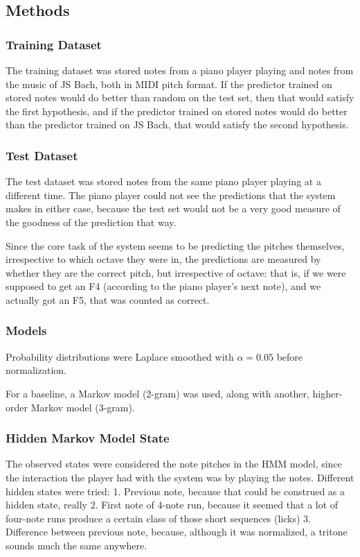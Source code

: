 \documentclass{article}
\begin{document}
\subsection*{Methods}
\subsubsection*{Training Dataset}
The training dataset was stored notes from a piano player playing and notes from the music of JS Bach, both in MIDI pitch format. If the predictor trained on stored notes would do better than random on the test set, then that would satisfy the first hypothesis, and if the predictor trained on stored notes would do better than the predictor trained on JS Bach, that would satisfy the second hypothesis.
\subsubsection*{Test Dataset}
The test dataset was stored notes from the same piano player playing at a different time. The piano player could not see the predictions that the system makes in either case, because the test set would not be a very good measure of the goodness of the prediction that way.

Since the core task of the system seems to be predicting the pitches themselves, irrespective to which octave they were in, the predictions are measured by whether they are the correct pitch, but irrespective of octave: that is, if we were supposed to get an F4 (according to the piano player's next note), and we actually got an F5, that was counted as correct.
\subsubsection*{Models}

Probability distributions were Laplace smoothed with $\alpha = 0.05$ before normalization.

For a baseline, a Markov model (2-gram) was used, along with another, higher-order Markov model (3-gram).

\subsubsection*{Hidden Markov Model State}
The observed states were considered the note pitches in the HMM model, since the interaction the player had with the system was by playing the notes.
Different hidden states were tried:
1. Previous note, because that could be construed as a hidden state, really
2. First note of 4-note run, because it seemed that a lot of four-note runs produce a certain class of those short sequences (licks)
3. Difference between previous note, because, although it was normalized, a tritone sounds much the same anywhere.
\end{document}

